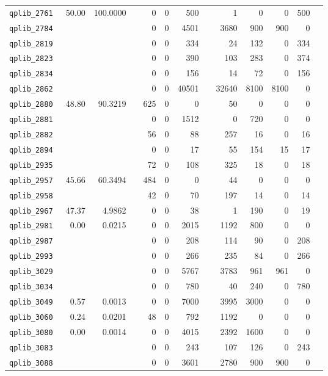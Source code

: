 \begin{longtable}{lrrrrrrrrrrrr}
{\tt 	qplib\_2761	}	&	50.00	&	100.0000	&	&	0	&	0	&	500	&	&	1	&	0	&	0	&	500	\\
{\tt 	qplib\_2784	}	&		&		&	&	0	&	0	&	4501	&	&	3680	&	900	&	900	&	0	\\
{\tt 	qplib\_2819	}	&		&		&	&	0	&	0	&	334	&	&	24	&	132	&	0	&	334	\\
{\tt 	qplib\_2823	}	&		&		&	&	0	&	0	&	390	&	&	103	&	283	&	0	&	374	\\
{\tt 	qplib\_2834	}	&		&		&	&	0	&	0	&	156	&	&	14	&	72	&	0	&	156	\\
{\tt 	qplib\_2862	}	&		&		&	&	0	&	0	&	40501	&	&	32640	&	8100	&	8100	&	0	\\
{\tt 	qplib\_2880	}	&	48.80	&	90.3219	&	&	625	&	0	&	0	&	&	50	&	0	&	0	&	0	\\
{\tt 	qplib\_2881	}	&		&		&	&	0	&	0	&	1512	&	&	0	&	720	&	0	&	0	\\
{\tt 	qplib\_2882	}	&		&		&	&	56	&	0	&	88	&	&	257	&	16	&	0	&	16	\\
{\tt 	qplib\_2894	}	&		&		&	&	0	&	0	&	17	&	&	55	&	154	&	15	&	17	\\
{\tt 	qplib\_2935	}	&		&		&	&	72	&	0	&	108	&	&	325	&	18	&	0	&	18	\\
{\tt 	qplib\_2957	}	&	45.66	&	60.3494	&	&	484	&	0	&	0	&	&	44	&	0	&	0	&	0	\\
{\tt 	qplib\_2958	}	&		&		&	&	42	&	0	&	70	&	&	197	&	14	&	0	&	14	\\
{\tt 	qplib\_2967	}	&	47.37	&	4.9862	&	&	0	&	0	&	38	&	&	1	&	190	&	0	&	19	\\
{\tt 	qplib\_2981	}	&	0.00	&	0.0215	&	&	0	&	0	&	2015	&	&	1192	&	800	&	0	&	0	\\
{\tt 	qplib\_2987	}	&		&		&	&	0	&	0	&	208	&	&	114	&	90	&	0	&	208	\\
{\tt 	qplib\_2993	}	&		&		&	&	0	&	0	&	266	&	&	235	&	84	&	0	&	266	\\
{\tt 	qplib\_3029	}	&		&		&	&	0	&	0	&	5767	&	&	3783	&	961	&	961	&	0	\\
{\tt 	qplib\_3034	}	&		&		&	&	0	&	0	&	780	&	&	40	&	240	&	0	&	780	\\
{\tt 	qplib\_3049	}	&	0.57	&	0.0013	&	&	0	&	0	&	7000	&	&	3995	&	3000	&	0	&	0	\\
{\tt 	qplib\_3060	}	&	0.24	&	0.0201	&	&	48	&	0	&	792	&	&	1192	&	0	&	0	&	0	\\
{\tt 	qplib\_3080	}	&	0.00	&	0.0014	&	&	0	&	0	&	4015	&	&	2392	&	1600	&	0	&	0	\\
{\tt 	qplib\_3083	}	&		&		&	&	0	&	0	&	243	&	&	107	&	126	&	0	&	243	\\
{\tt 	qplib\_3088	}	&		&		&	&	0	&	0	&	3601	&	&	2780	&	900	&	900	&	0	\\

\end{longtable}
